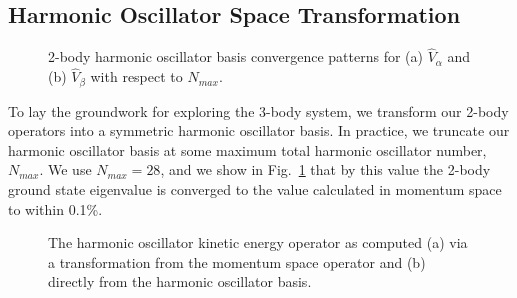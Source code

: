 \subsection{Harmonic Oscillator Space Transformation}
\begin{figure}[t]
\begin{center}
\end{center}
\caption{2-body harmonic oscillator basis convergence patterns for (a) $\hat{V}_\alpha$ and (b) $\hat{V}_\beta$ with respect to $N_{max}$.}
\label{fig:2body_nmax}
\end{figure}

To lay the groundwork for exploring the 3-body system, we transform our 2-body operators into a symmetric harmonic oscillator basis. In practice, we truncate our harmonic oscillator basis at some maximum total harmonic oscillator number, $N_{max}$. We use $N_{max}=28$, and we show in Fig.~\ref{fig:2body_nmax} that by this value the 2-body ground state eigenvalue is converged to the value calculated in momentum space to within 0.1\%.

\begin{figure}[t]
\begin{center}
\end{center}
\caption{The harmonic oscillator kinetic energy operator as computed (a) via a transformation from the momentum space operator and (b) directly from the harmonic oscillator basis.}
\label{fig:2body_kin_comp}
\end{figure}

